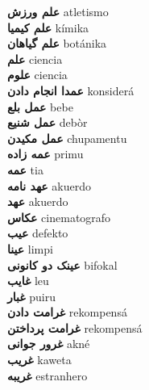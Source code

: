 \textbf{ علم ورزش  } atletismo \\
\textbf{ علم کیمیا  } kímika \\
\textbf{ علم گیاهان  } botánika \\
\textbf{ علم  } ciencia \\
\textbf{ علوم  } ciencia \\
\textbf{ عمدا انجام دادن  } konsiderá \\
\textbf{ عمل بلع  } bebe \\
\textbf{ عمل شنیع  } debòr \\
\textbf{ عمل مکیدن  } chupamentu \\
\textbf{ عمه زاده  } primu \\
\textbf{ عمه  } tia \\
\textbf{ عهد نامه  } akuerdo \\
\textbf{ عهد  } akuerdo \\
\textbf{ عکاس  } cinematografo \\
\textbf{ عیب  } defekto \\
\textbf{ عینا  } limpi \\
\textbf{ عینک دو کانونی  } bifokal \\
\textbf{ غایب  } leu \\
\textbf{ غبار  } puiru \\
\textbf{ غرامت دادن  } rekompensá \\
\textbf{ غرامت پرداختن  } rekompensá \\
\textbf{ غرور جوانی  } akné \\
\textbf{ غریب  } kaweta \\
\textbf{ غریبه  } estranhero \\

